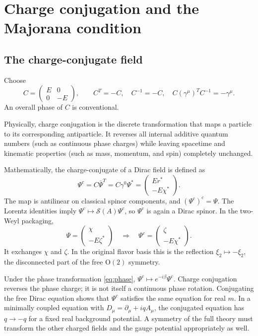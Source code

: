 \documentclass[11pt]{article}
\newcommand{\OO}{\mathrm{O}}
\begin{document}
\section{Charge conjugation and the Majorana condition}
\subsection{The charge-conjugate field}
Choose
\begin{equation}
 C=\begin{pmatrix}E&0\\0&-E\end{pmatrix},\qquad
 C^T=-C,\quad C^{-1}=-C,\quad
 C(\gamma^\mu)^T C^{-1}=-\gamma^\mu.
 \label{eq:C}
\end{equation}
An overall phase of \(C\) is conventional. 

Physically, charge conjugation is the discrete transformation that maps a particle to its corresponding antiparticle. It reverses all internal additive quantum numbers (such as continuous phase charges) while leaving spacetime and kinematic properties (such as mass, momentum, and spin) completely unchanged.

Mathematically, the charge-conjugate of a Dirac field is defined as
\begin{equation}
 \Psi^c=C\bar\Psi^T=C\gamma^0\Psi^*
       =\begin{pmatrix}E r^*\\-E\chi^*\end{pmatrix}.
 \label{eq:chargeconj}
\end{equation}
The map is antilinear on classical spinor components, and
\((\Psi^c)^c=\Psi\). The Lorentz identities imply
\(\Psi^c\mapsto\mathcal S(A)\Psi^c\), so \(\Psi^c\) is again
a Dirac spinor. In the two-Weyl packaging,
\begin{equation}
 \Psi=\begin{pmatrix}\chi\\-E\zeta^*\end{pmatrix}
 \quad\Longrightarrow\quad
 \Psi^c=\begin{pmatrix}\zeta\\-E\chi^*\end{pmatrix}.
 \label{eq:swap}
\end{equation}
It exchanges \(\chi\) and \(\zeta\). In the original flavor basis
this is the reflection \(\xi_2\mapsto-\xi_2\), the disconnected
part of the free \(\OO(2)\) symmetry.

Under the phase transformation \eqref{eq:phase},
\(\Psi^c\mapsto e^{-i\beta}\Psi^c\). Charge conjugation reverses
the phase charge; it is not itself a continuous phase rotation.
Conjugating the free Dirac equation shows that \(\Psi^c\) satisfies
the same equation for real \(m\). In a minimally coupled equation
with \(D_\mu=\partial_\mu+iqA_\mu\), the conjugated equation has
\(q\to-q\) for a fixed real background potential. A symmetry of
the full theory must transform the other charged fields and the gauge
potential appropriately as well.
\end{document}
